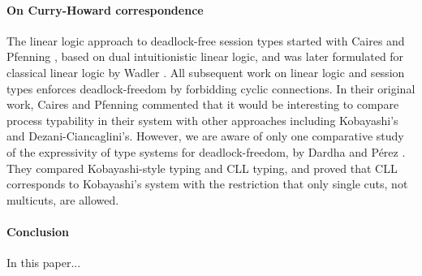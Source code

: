 \documentclass[main.tex]{subfiles}
\begin{document}
\paragraph{On Curry-Howard correspondence}
The linear logic approach to deadlock-free session types started with Caires and Pfenning \cite{CP10}, based on dual intuitionistic linear logic, and was later formulated for classical linear logic by Wadler \cite{wadler2012}. All subsequent work on linear logic and session types enforces deadlock-freedom by forbidding cyclic connections. In their original work, Caires and Pfenning commented that it would be interesting to compare process typability in their system with other approaches including Kobayashi's and Dezani-Ciancaglini's. However, we are aware of only one comparative study of the expressivity of type systems for deadlock-freedom, by Dardha and P\'{e}rez \cite{DardhaP15}. They compared Kobayashi-style typing and CLL typing, and proved that CLL corresponds to Kobayashi's system with the restriction that only single cuts, not multicuts, are allowed.

\paragraph{Conclusion}
In this paper...
\end{document}
